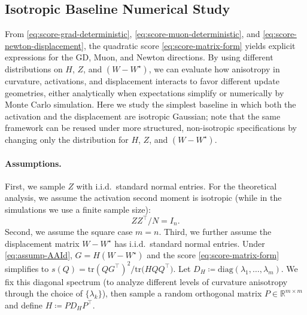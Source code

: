 \documentclass[11pt]{article}
\newcommand{\R}{\mathbb{R}}
\begin{document}
\subsection{Isotropic Baseline Numerical Study}

From \eqref{eq:score-grad-deterministic}, \eqref{eq:score-muon-deterministic}, and \eqref{eq:score-newton-displacement}, the quadratic score
\eqref{eq:score-matrix-form} yields explicit expressions for the GD, Muon, and Newton directions. By using different distributions on ${H}$, ${Z}$, and $({W}-W^\star)$, we can evaluate how
anisotropy in curvature, activations, and displacement interacts to favor different update geometries, either analytically when expectations simplify or
numerically by Monte Carlo simulation.
Here we study the simplest baseline in which both the activation and the displacement are isotropic Gaussian; note that the same framework can be reused under more structured, non-isotropic
specifications by changing only the distribution for ${H}$, ${Z}$, and $({W}-W^\star)$.

\paragraph{Assumptions.}
First, we sample ${Z}$ with i.i.d.\ standard normal entries. For the theoretical analysis, we assume the activation second moment is isotropic (while in the simulations we use a finite sample size):
\begin{equation}
  \label{eq:assump-AAId}
  {Z}{Z}^\top/N = {I}_n.
\end{equation}
Second, we assume the square case \(m=n\). Third, we further assume the displacement matrix \({W}-W^\star\) has i.i.d.\ standard normal entries. Under \eqref{eq:assump-AAId}, \({G}={H}({W}-W^\star)\) and the score \eqref{eq:score-matrix-form} simplifies to \(s({Q})=\mathrm{tr}({Q}{G}^\top)^2/\mathrm{tr}\big({H}{Q}{Q}^\top\big)\). Let \({D}_{{H}}\coloneqq\mathrm{diag}(\lambda_1,\dots,\lambda_m)\). We fix this diagonal spectrum (to analyze different levels of curvature anisotropy through the choice of \(\{\lambda_k\}\)), then sample a random orthogonal matrix \({P}\in\R^{m\times m}\) and define \({H}\coloneqq {P}{D}_{{H}}{P}^\top\).
\end{document}

